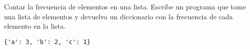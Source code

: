 \begin{exercise}
Contar la frecuencia de elementos en una lista. Escribe un programa
que tome una lista de elementos y devuelva un diccionario con la
frecuencia de cada elemento en la lista.

\begin{Shaded}
\begin{Highlighting}[]
 

     \NormalTok{(}\OperatorTok{**}\NormalTok{) }\OperatorTok{+} 

\OperatorTok{=}\NormalTok{ [}\NormalTok{, }\NormalTok{, }\NormalTok{, }\NormalTok{, }\NormalTok{, }\NormalTok{]}
\OperatorTok{=}
\end{Highlighting}
\end{Shaded}

\begin{verbatim}
{'a': 3, 'b': 2, 'c': 1}

\end{verbatim}
\end{exercise}

